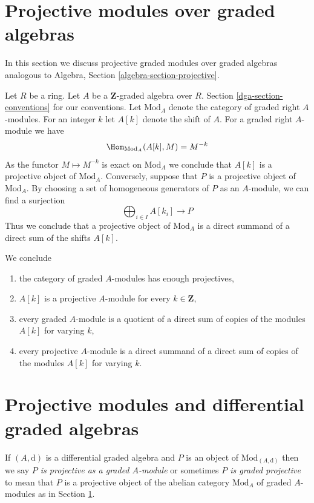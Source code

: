 \section{Projective modules over graded algebras}
\label{dga-section-projectives-over-graded-algebras}
In this section we discuss projective graded modules over graded algebras
analogous to Algebra, Section \ref{algebra-section-projective}.

\medskip\noindent
Let $R$ be a ring. Let $A$ be a $\mathbf{Z}$-graded algebra over $R$.
Section \ref{dga-section-conventions} for our conventions.
Let $\text{Mod}_A$ denote the category of graded right $A$-modules.
For an integer $k$ let $A[k]$ denote the shift of $A$.
For a graded right $A$-module we have
$$
\Hom_{\text{Mod}_A}(A[k], M) = M^{-k}
$$
As the functor $M \mapsto M^{-k}$ is exact on $\text{Mod}_A$ we
conclude that $A[k]$ is a projective object of $\text{Mod}_A$.
Conversely, suppose that $P$ is a projective object of $\text{Mod}_A$.
By choosing a set of homogeneous generators of $P$ as an $A$-module,
we can find a surjection
$$
\bigoplus\nolimits_{i \in I} A[k_i] \longrightarrow P
$$
Thus we conclude that a projective object of $\text{Mod}_A$ is
a direct summand of a direct sum of the shifts $A[k]$.

\medskip\noindent
We conclude
\begin{enumerate}
\item the category of graded $A$-modules has enough projectives,
\item $A[k]$ is a projective $A$-module for every $k \in \mathbf{Z}$,
\item every graded $A$-module is a quotient of a direct sum of
copies of the modules $A[k]$ for varying $k$,
\item every projective $A$-module is a direct summand of a direct
sum of copies of the modules $A[k]$ for varying $k$.
\end{enumerate}

\section{Projective modules and differential graded algebras}
\label{dga-section-projective-over-differential-graded}
If $(A, \text{d})$ is a differential graded algebra and $P$ is
an object of $\text{Mod}_{(A, \text{d})}$ then we say
{\it $P$ is projective as a graded $A$-module} or sometimes
{\it $P$ is graded projective} to mean that $P$
is a projective object of the abelian category $\text{Mod}_A$
of graded $A$-modules as in
Section \ref{dga-section-projectives-over-graded-algebras}.

